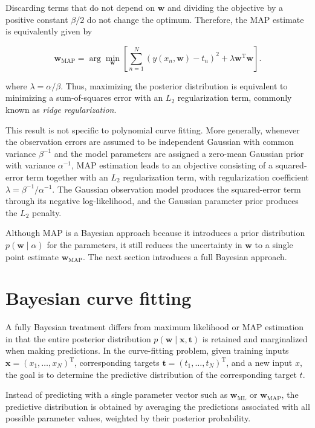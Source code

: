 \documentclass[10pt,twocolumn]{memoir}
\begin{document}
Discarding terms that do not depend on $\mathbf{w}$ and dividing the objective by a positive constant $\beta/2$ do not change the optimum. Therefore, the MAP estimate is equivalently given by

\begin{equation}
    \mathbf{w}_{\mathrm{MAP}} = \arg\min_{\mathbf{w}}\left[\sum_{n=1}^{N}\left(y(x_n,\mathbf{w})-t_n\right)^2 + \lambda\mathbf{w}^{\mathrm{T}}\mathbf{w}\right].
\end{equation}

where $\lambda=\alpha/\beta$. Thus, maximizing the posterior distribution is equivalent to minimizing a sum-of-squares error with an $L_2$ regularization term, commonly known as \textit{ridge regularization}.

This result is not specific to polynomial curve fitting. More generally, whenever the observation errors are assumed to be independent Gaussian with common variance $\beta^{-1}$ and the model parameters are assigned a zero-mean Gaussian prior with variance $\alpha^{-1}$, MAP estimation leads to an objective consisting of a squared-error term together with an $L_2$ regularization term, with regularization coefficient $\lambda=\beta^{-1}/\alpha^{-1}$. The Gaussian observation model produces the squared-error term through its negative log-likelihood, and the Gaussian parameter prior produces the $L_2$ penalty.

Although MAP is a Bayesian approach because it introduces a prior distribution $p(\mathbf{w}\mid\alpha)$ for the parameters, it still reduces the uncertainty in $\mathbf{w}$ to a single point estimate $\mathbf{w}_{\mathrm{MAP}}$. The next section introduces a full Bayesian approach.

\section{Bayesian curve fitting}

A fully Bayesian treatment differs from maximum likelihood or MAP estimation in that the entire posterior distribution $p(\mathbf{w}\mid\mathbf{x},\mathbf{t})$ is retained and marginalized when making predictions. In the curve-fitting problem, given training inputs $\mathbf{x}=(x_1,\ldots,x_N)^{\mathrm{T}}$, corresponding targets $\mathbf{t}=(t_1,\ldots,t_N)^{\mathrm{T}}$, and a new input $x$, the goal is to determine the predictive distribution of the corresponding target $t$.

Instead of predicting with a single parameter vector such as $\mathbf{w}_{\mathrm{ML}}$ or $\mathbf{w}_{\mathrm{MAP}}$, the predictive distribution is obtained by averaging the predictions associated with all possible parameter values, weighted by their posterior probability.
\end{document}
